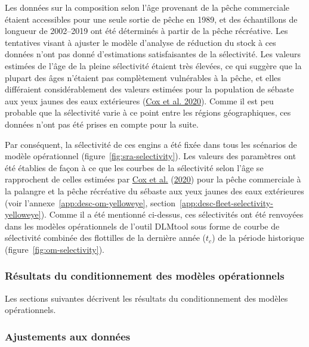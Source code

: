 \documentclass[11pt]{book}
\begin{document}
Les données sur la composition selon l'âge provenant de la pêche commerciale étaient accessibles pour une seule sortie de pêche en 1989, et des échantillons de longueur de 2002--2019 ont été déterminés à partir de la pêche récréative. Les tentatives visant à ajuster le modèle d'analyse de réduction du stock à ces données n'ont pas donné d'estimations satisfaisantes de la sélectivité. Les valeurs estimées de l'âge de la pleine sélectivité étaient très élevées, ce qui suggère que la plupart des âges n'étaient pas complètement vulnérables à la pêche, et elles différaient considérablement des valeurs estimées pour la population de sébaste aux yeux jaunes des eaux extérieures (\protect\hyperlink{ref-cox2020}{Cox et al. 2020}). Comme il est peu probable que la sélectivité varie à ce point entre les régions géographiques, ces données n'ont pas été prises en compte pour la suite.

Par conséquent, la sélectivité de ces engins a été fixée dans tous les scénarios de modèle opérationnel (figure~\ref{fig:sra-selectivity}). Les valeurs des paramètres ont été établies de façon à ce que les courbes de la sélectivité selon l'âge se rapprochent de celles estimées par \protect\hyperlink{ref-cox2020}{Cox et al.} (\protect\hyperlink{ref-cox2020}{2020}) pour la pêche commerciale à la palangre et la pêche récréative du sébaste aux yeux jaunes des eaux extérieures (voir l'annexe~\ref{app:desc-om-yelloweye}, section~\ref{app:desc-fleet-selectivity-yelloweye}). Comme il a été mentionné ci-dessus, ces sélectivités ont été renvoyées dans les modèles opérationnels de l'outil DLMtool sous forme de courbe de sélectivité combinée des flottilles de la dernière année (\(t_c\)) de la période historique (figure~\ref{fig:om-selectivity}).

\hypertarget{sec:approach3-conditioning-results}{%
\subsubsection{Résultats du conditionnement des modèles opérationnels}\label{sec:approach3-conditioning-results}}

Les sections suivantes décrivent les résultats du conditionnement des modèles opérationnels.

\hypertarget{sec:approach3-conditioning-indices}{%
\subsubsection{Ajustements aux données}\label{sec:approach3-conditioning-indices}}
\end{document}
